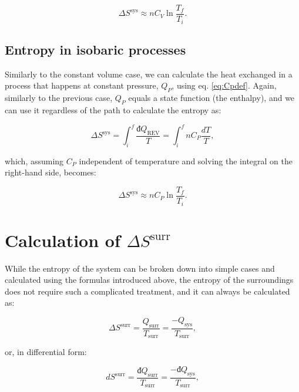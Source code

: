 \documentclass[
  9pt,
]{extbook}
\theoremstyle{definition}
\theoremstyle{definition}
\theoremstyle{definition}
\theoremstyle{remark}
\begin{document}
\begin{equation}
\Delta S^{\mathrm{sys}} \approx n C_V \ln \frac{T_f}{T_i}.
\label{eq:sconstV}
\end{equation}

\hypertarget{entropy-in-isobaric-processes}{%
\subsection{Entropy in isobaric processes}\label{entropy-in-isobaric-processes}}

Similarly to the constant volume case, we can calculate the heat exchanged in a process that happens at constant pressure, \(Q_P\), using eq. \eqref{eq:Cpdef}. Again, similarly to the previous case, \(Q_P\) equals a state function (the enthalpy), and we can use it regardless of the path to calculate the entropy as:

\begin{equation}
\Delta S^{\mathrm{sys}} = \int_i^f \frac{đQ_{\mathrm{REV}}}{T} = \int_i^f nC_P \frac{dT}{T},
\label{eq:sconstP1}
\end{equation}

which, assuming \(C_P\) independent of temperature and solving the integral on the right-hand side, becomes:

\begin{equation}
\Delta S^{\mathrm{sys}} \approx n C_P \ln \frac{T_f}{T_i}.
\label{eq:sconstP}
\end{equation}

\hypertarget{dssurr}{%
\section{\texorpdfstring{Calculation of \(\Delta S^{\mathrm{surr}}\)}{Calculation of \textbackslash Delta S\^{}\{\textbackslash mathrm\{surr\}\}}}\label{dssurr}}

While the entropy of the system can be broken down into simple cases and calculated using the formulas introduced above, the entropy of the surroundings does not require such a complicated treatment, and it can always be calculated as:

\begin{equation}
\Delta S^{\mathrm{surr}} = \frac{Q_{\text{surr}}}{T_{\text{surr}}}=\frac{-Q_{\text{sys}}}{T_{\text{surr}}},
\label{eq:dssurr}
\end{equation}

or, in differential form:

\begin{equation}
d S^{\mathrm{surr}} = \frac{đQ_{\text{surr}}}{T_{\text{surr}}}=\frac{-đQ_{\text{sys}}}{T_{\text{surr}}},
\label{eq:dssurrd}
\end{equation}
\end{document}
